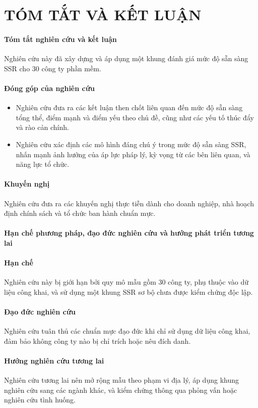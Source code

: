 \chapter{TÓM TẮT VÀ KẾT LUẬN}

\subsubsection{Tóm tắt nghiên cứu và kết luận}
Nghiên cứu này đã xây dựng và áp dụng một khung đánh giá mức độ sẵn sàng SSR cho 30 công ty phần mềm.

\subsubsection{Đóng góp của nghiên cứu}
\begin{itemize}
\item Nghiên cứu đưa ra các kết luận then chốt liên quan đến mức độ sẵn sàng tổng thể, điểm mạnh và điểm yếu theo chủ đề, cũng như các yếu tố thúc đẩy và rào cản chính.
\item Nghiên cứu xác định các mô hình đáng chú ý trong mức độ sẵn sàng SSR, nhấn mạnh ảnh hưởng của áp lực pháp lý, kỳ vọng từ các bên liên quan, và năng lực tổ chức.
\end{itemize}

\subsubsection{Khuyến nghị}
Nghiên cứu đưa ra các khuyến nghị thực tiễn dành cho doanh nghiệp, nhà hoạch định chính sách và tổ chức ban hành chuẩn mực.

\subsubsection{Hạn chế phương pháp, đạo đức nghiên cứu và hướng phát triển tương lai}

\subsubsection{Hạn chế}
Nghiên cứu này bị giới hạn bởi quy mô mẫu gồm 30 công ty, phụ thuộc vào dữ liệu công khai, và sử dụng một khung SSR sơ bộ chưa được kiểm chứng độc lập.

\subsubsection{Đạo đức nghiên cứu}
Nghiên cứu tuân thủ các chuẩn mực đạo đức khi chỉ sử dụng dữ liệu công khai, đảm bảo không công ty nào bị chỉ trích hoặc nêu đích danh.

\subsubsection{Hướng nghiên cứu tương lai}
Nghiên cứu tương lai nên mở rộng mẫu theo phạm vi địa lý, áp dụng khung nghiên cứu sang các ngành khác, và kiểm chứng thông qua phỏng vấn hoặc nghiên cứu tình huống.